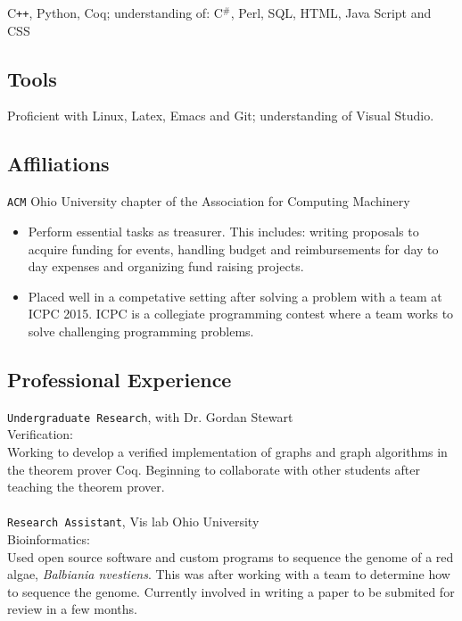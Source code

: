 \documentclass[11pt]{article} %
\begin{document}
C\texttt{++}, Python, Coq; understanding of: C$^\texttt{\#}$, Perl, SQL, HTML, Java Script and CSS 
\subsection*{Tools}
Proficient with Linux, Latex, Emacs and Git; understanding of Visual Studio.


\subsection*{Affiliations}
\texttt{ACM} Ohio University chapter of the Association for Computing Machinery
\begin{itemize}
\item Perform essential tasks as treasurer. This includes: writing proposals to acquire funding for events, handling budget and reimbursements for day to day expenses and organizing fund raising projects.
\item Placed well in a competative setting after solving a problem with a team at ICPC 2015. ICPC is a collegiate programming contest where a team works to solve challenging programming problems. 
\end{itemize}
\subsection*{Professional Experience} 
\texttt{Undergraduate Research}, with Dr. Gordan Stewart \\
Verification: \\
Working to develop a verified implementation of graphs and graph algorithms in the theorem prover Coq.  Beginning to collaborate with other students after teaching the theorem prover.\\ \\
\texttt{Research Assistant}, Vis lab Ohio University \\
Bioinformatics: \\
Used open source software and custom programs to sequence the genome of a red algae,\textit{ Balbiania nvestiens}. This was after working with a team to determine how to sequence the genome. Currently involved in writing a paper to be submited for review in a few months.
           
\end{document}
